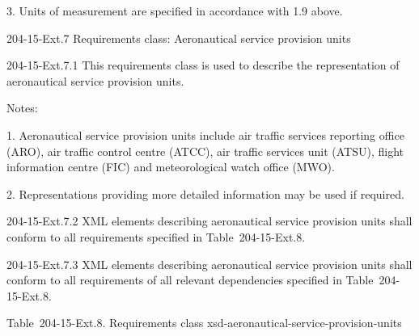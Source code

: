 3. Units of measurement are specified in accordance with 1.9 above.

204-15-Ext.7 Requirements class: Aeronautical service provision units

204-15-Ext.7.1 This requirements class is used to describe the representation of aeronautical service provision units.

Notes:

1. Aeronautical service provision units include air traffic services reporting office (ARO), air traffic control centre (ATCC), air traffic services unit (ATSU), flight information centre (FIC) and meteorological watch office (MWO).

2. Representations providing more detailed information may be used if required.

204-15-Ext.7.2 XML elements describing aeronautical service provision units shall conform to all requirements specified in Table~204-15-Ext.8.

204-15-Ext.7.3 XML elements describing aeronautical service provision units shall conform to all requirements of all relevant dependencies specified in Table~204-15-Ext.8.

Table~204-15-Ext.8. Requirements class xsd-aeronautical-service-provision-units

